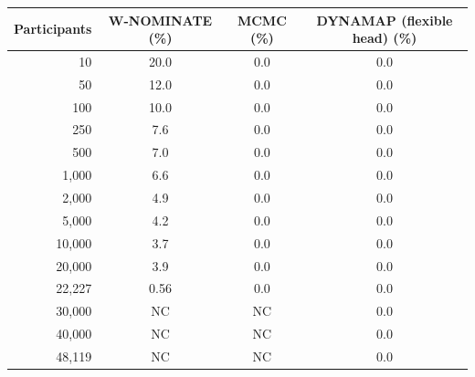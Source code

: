 \begin{tabular}{rccc}
\toprule
Participants & W-NOMINATE (\%) & MCMC (\%) & DYNAMAP (flexible head) (\%) \\
\midrule
10 & 20.0 & 0.0 & 0.0 \\
50 & 12.0 & 0.0 & 0.0 \\
100 & 10.0 & 0.0 & 0.0 \\
250 & 7.6 & 0.0 & 0.0 \\
500 & 7.0 & 0.0 & 0.0 \\
1,000 & 6.6 & 0.0 & 0.0 \\
2,000 & 4.9 & 0.0 & 0.0 \\
5,000 & 4.2 & 0.0 & 0.0 \\
10,000 & 3.7 & 0.0 & 0.0 \\
20,000 & 3.9 & 0.0 & 0.0 \\
22,227 & 0.56 & 0.0 & 0.0 \\
30,000 & NC & NC & 0.0 \\
40,000 & NC & NC & 0.0 \\
48,119 & NC & NC & 0.0 \\
\bottomrule
\end{tabular}
